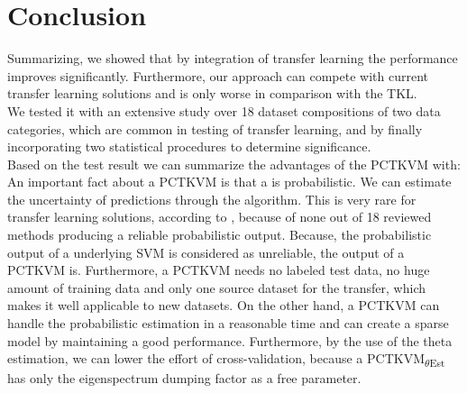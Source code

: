 \section{Conclusion}\label{EmSecConc}
Summarizing, we showed that by integration of transfer learning the performance improves significantly. Furthermore, our approach can compete with current transfer learning solutions and is only worse in comparison with the \acs{TKL}.\\
We tested it with an extensive study over 18 dataset compositions of two data categories, which are common in testing of transfer learning, and by finally incorporating two statistical procedures to determine significance.\\
Based on the test result we can summarize the advantages of the \acs{PCTKVM} with:
An important fact about a \acs{PCTKVM} is that a is probabilistic. We can estimate the uncertainty of predictions through the algorithm.
This is very rare for transfer learning solutions, according to \cite{Weiss.2016}, because of none out of 18 reviewed methods producing a reliable probabilistic output.
Because, the probabilistic output of a underlying \acs{SVM} is considered as unreliable\cite{Tipping.2001}, the output of a \acs{PCTKVM} is.\cite{Chen.2009}
Furthermore, a \acs{PCTKVM} needs no labeled test data, no huge amount of training data and only one source dataset for the transfer, which makes it well applicable to new datasets.
On the other hand, a \acs{PCTKVM} can handle the probabilistic estimation in a reasonable time and can create a sparse model by maintaining a good performance.
Furthermore, by the use of the theta estimation, we can lower the effort of cross-validation, because a \acs{PCTKVM}\textsubscript{$\theta$Est} has only the eigenspectrum dumping factor as a free parameter.

